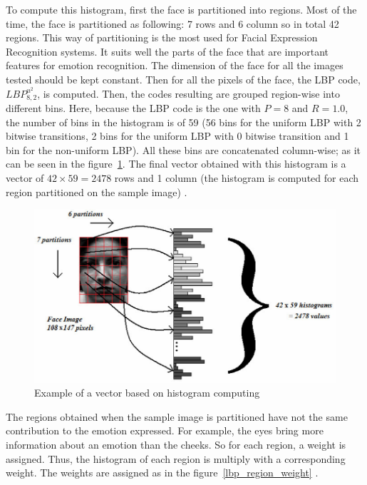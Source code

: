 \noindent To compute this histogram, first the face is partitioned into regions. Most of the time, the face is partitioned as following: 7 rows and 6 column so in total 42 regions. This way of partitioning is the most used for Facial Expression Recognition systems. It suits well the parts of the face that are important features for emotion recognition. The dimension of the face for all the images tested should be kept constant. Then for all the pixels of the face, the LBP code, $ LBP_{8,2}^{u^2} $, is computed. Then, the codes resulting are grouped region-wise into different bins. Here, because the LBP code is the one with $ P = 8 $ and $ R = 1.0 $, the number of bins in the histogram is of 59 (56 bins for the uniform LBP with 2 bitwise transitions, 2 bins for the uniform LBP with 0 bitwise transition and 1 bin for the non-uniform LBP). All these bins are concatenated column-wise; as it can be seen in the figure~\ref{lbp_histogram}. The final vector obtained with this histogram is a vector of $ 42\times59 = 2478 $ rows and 1 column (the histogram is computed for each region partitioned on the sample image) \cite{GAN08}.
\newline

\begin{figure}[!h]
\begin{center}
\noindent \includegraphics[scale=0.4]{figures/lbp_histogram} 
\newline
\caption{Example of a vector based on histogram computing}
\label{lbp_histogram}
\end{center} 
\end{figure}

\noindent The regions obtained when the sample image is partitioned have not the same contribution to the emotion expressed. For example, the eyes bring more information about an emotion than the cheeks. So for each region, a weight is assigned. Thus, the histogram of each region is multiply with a corresponding weight. The weights are assigned as in the figure~\ref{lbp_region_weight} \cite{GAN08}.
\newline

